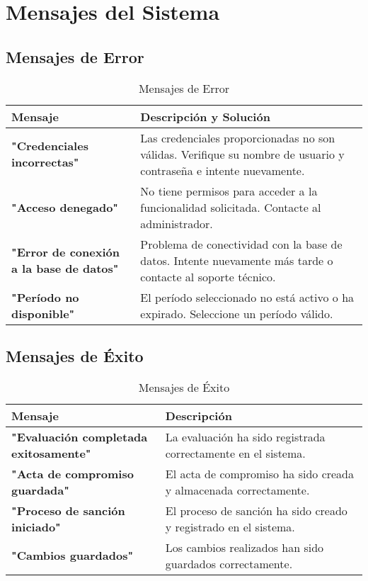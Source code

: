 \documentclass[12pt,a4paper]{article}
\begin{document}
\section{Mensajes del Sistema}\label{sec:mensajes}
\subsection{Mensajes de Error}
\begin{table}[H]
  \centering
  \caption{Mensajes de Error}\label{tab:mensajes-error}
  \begin{tabularx}{\textwidth}{>{\bfseries}lX}
    \toprule
    Mensaje & Descripción y Solución \\
    \midrule
    "Credenciales incorrectas" & Las credenciales proporcionadas no son válidas. Verifique su nombre de usuario y contraseña e intente nuevamente. \\
    "Acceso denegado" & No tiene permisos para acceder a la funcionalidad solicitada. Contacte al administrador. \\
    "Error de conexión a la base de datos" & Problema de conectividad con la base de datos. Intente nuevamente más tarde o contacte al soporte técnico. \\
    "Período no disponible" & El período seleccionado no está activo o ha expirado. Seleccione un período válido. \\
    \bottomrule
  \end{tabularx}
\end{table}

\subsection{Mensajes de Éxito}
\begin{table}[H]
  \centering
  \caption{Mensajes de Éxito}\label{tab:mensajes-exito}
  \begin{tabularx}{\textwidth}{>{\bfseries}lX}
    \toprule
    Mensaje & Descripción \\
    \midrule
    "Evaluación completada exitosamente" & La evaluación ha sido registrada correctamente en el sistema. \\
    "Acta de compromiso guardada" & El acta de compromiso ha sido creada y almacenada correctamente. \\
    "Proceso de sanción iniciado" & El proceso de sanción ha sido creado y registrado en el sistema. \\
    "Cambios guardados" & Los cambios realizados han sido guardados correctamente. \\
    \bottomrule
  \end{tabularx}
\end{table}
\end{document}
